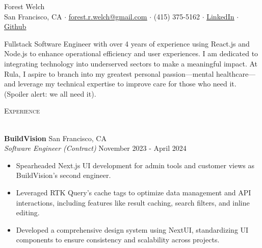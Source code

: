 \documentclass[a4paper]{article}
\newcommand{\header} [1] {
    {\hspace*{-18pt}\vspace*{3pt} \textcolor{deeppurple}{\textsc{#1}}}
    \vspace*{-12pt} \\
    \hspace*{-18pt} \textcolor{deeppurple}{\hrulefill} \\
}
\begin{document}
\vspace{-40pt}

\begin{center}
    {\fontsize{36}{36}\selectfont \textcolor{deeppurple}{Forest Welch}} \\ %
    \vspace{10pt} %
    \small San Francisco, CA $\cdot$ \href{mailto:forest.r.welch@gmail.com}{\underline{forest.r.welch@gmail.com}} $\cdot$ (415) 375-5162 $\cdot$ \href{https://linkedin.com/in/forestrwelch}{\underline{LinkedIn}} $\cdot$ \href{https://github.com/nwelchr}{\underline{Github}}
\end{center}

\vspace{10pt}

Fullstack Software Engineer with over 4 years of experience using React.js and Node.js to enhance operational efficiency and user experiences. I am dedicated to integrating technology into underserved sectors to make a meaningful impact. At Rula, I aspire to branch into my greatest personal passion—mental healthcare—and leverage my technical expertise to improve care for those who need it. (Spoiler alert: we all need it).

\vspace{10pt}

\header{Experience}
\vspace{1mm}

\textbf{BuildVision} \hfill San Francisco, CA\\
\textit{Software Engineer (Contract)} \hfill November 2023 - April 2024\\
\vspace{-1mm}
\begin{itemize} \itemsep .5pt
    \item Spearheaded Next.js UI development for admin tools and customer views as BuildVision's second engineer.
    \item Leveraged RTK Query's cache tags to optimize data management and API interactions, including features like result caching, search filters, and inline editing.
    \item Developed a comprehensive design system using NextUI, standardizing UI components to ensure consistency and scalability across projects.
\end{itemize}
\end{document}
